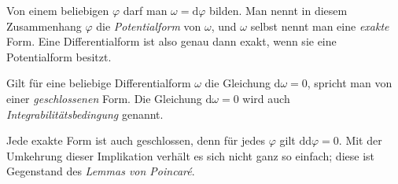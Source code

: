 Von einem beliebigen
$\varphi$ darf man $\omega = \mathrm d\varphi$ bilden. Man nennt
in diesem Zusammenhang $\varphi$ die \emph{Potentialform} von
$\omega$, und $\omega$ selbst nennt man eine \emph{exakte} Form.
Eine Differentialform ist also genau dann exakt, wenn sie eine
Potentialform besitzt.

Gilt für eine beliebige Differentialform $\omega$ die Gleichung
$\mathrm d\omega=0$, spricht man von einer \emph{geschlossenen} Form.
Die Gleichung $\mathrm d\omega=0$ wird auch
\emph{Integrabilitätsbedingung} genannt.

Jede exakte Form ist auch geschlossen, denn für jedes $\varphi$ gilt
$\mathrm d\mathrm d\varphi=0$. Mit der Umkehrung dieser Implikation
verhält es sich nicht ganz so einfach; diese ist Gegenstand des
\emph{Lemmas von Poincaré}.

